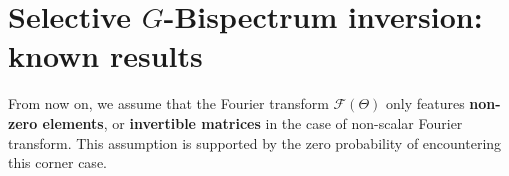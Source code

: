 \documentclass{article}
\theoremstyle{plain}
\theoremstyle{definition}
\theoremstyle{remark}
\begin{document}
\section{Selective $G$-Bispectrum inversion: known results}\label{sec:commutative_alg}
From now on, we assume that the Fourier transform $\mathcal{F}(\Theta)$ only features \textbf{non-zero elements}, or \textbf{invertible matrices} in the case of non-scalar Fourier transform. This assumption is supported by the zero probability of encountering this corner case.
\end{document}
